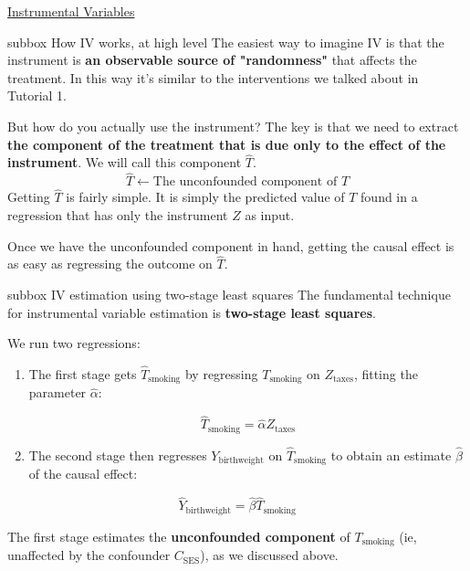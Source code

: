\begin{textbox}{\href{https://compneuro.neuromatch.io/tutorials/W3D5_NetworkCausality/student/W3D5_Tutorial4.html}{Instrumental Variables }   }
\begin{subbox}{subbox}{ How IV works, at high level
}
\scriptsize
The easiest way to imagine IV is that the instrument is \textbf{an observable source of "randomness"} that affects the treatment. In this way it's similar to the interventions we talked about in Tutorial 1.

But how do you actually use the instrument? The key is that we need to extract \textbf{the component of the treatment that is due only to the effect of the instrument}. We will call this component $\hat{T}$.
$$
\hat{T}\leftarrow \text{The unconfounded component of }T
$$
Getting $\hat{T}$ is fairly simple. It is simply the predicted value of $T$ found in a regression that has only the instrument $Z$ as input.

Once we have the unconfounded component in hand, getting the causal effect is as easy as regressing the outcome on $\hat{T}$.

\end{subbox}
\begin{subbox}{subbox}{ IV estimation using two-stage least squares
}
\scriptsize
The fundamental technique for instrumental variable estimation is \textbf{two-stage least squares}. 

We run two regressions:
\begin{enumerate}
    \item 
 The first stage gets  $\hat{T}_{\text{smoking}}$ by regressing $T_{\text{smoking}}$ on $Z_\text{taxes}$, fitting the parameter $\hat{\alpha}$:

\begin{equation}
\hat{T}_{\text{smoking}} = \hat{\alpha} Z_\text{taxes}
\end{equation}

\item The second stage then regresses $Y_{\text{birthweight}}$ on $\hat{T}_{\text{smoking}}$ to obtain an estimate $\hat{\beta}$ of the causal effect:
\end{enumerate}

\begin{equation}
\hat{Y}_{\text{birthweight}} = \hat{\beta} \hat{T}_{\text{smoking}} 
\end{equation}

The first stage estimates the \textbf{unconfounded component} of $T_{\text{smoking}}$ (ie, unaffected by the confounder $C_{\text{SES}}$), as we discussed above. 


\end{subbox}
\end{textbox}
